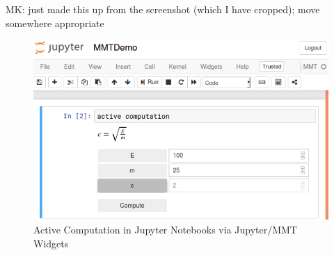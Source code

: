 \begin{newpart}{MK: just made this up from the screenshot (which I have cropped); move somewhere appropriate}
  \begin{figure}[ht]\centering
    \includegraphics[width=12cm]{activecomp}
    \caption{Active Computation in Jupyter Notebooks via Jupyter/MMT Widgets}\label{fig:ac}
  \end{figure}
\end{newpart}


